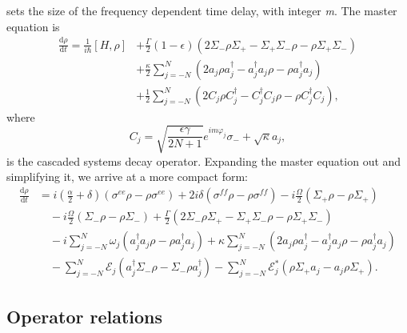 \documentclass{article}
\begin{document}
sets the size of the frequency dependent time delay, with integer \textit{m}. The master equation is
\begin{align}\label{master_equation_full}
	\frac{\mathrm{d} \rho}{\mathrm{d} t} = \frac{1}{i \hbar} [H, \rho] &+ \frac{\Gamma}{2}(1 - \epsilon) \left(2 \Sigma_{-} \rho \Sigma_{+} - \Sigma_{+} \Sigma_{-} \rho - \rho \Sigma_{+} \Sigma_{-}\right) \nonumber \\
	&+ \frac{\kappa}{2} \sum_{j=-N}^{N} \left( 2 a_{j} \rho a^{\dagger}_{j} - a^{\dagger}_{j} a_{j} \rho - \rho a^{\dagger}_{j} a_{j} \right) \\
	&+ \frac{1}{2} \sum_{j=-N}^{N} \left(2 C_{j} \rho C^{\dagger}_{j} - C^{\dagger}_{j} C_{j} \rho - \rho C^{\dagger}_{j} C_{j} \right), \nonumber
\end{align}
where
\begin{equation}
	C_{j} = \sqrt{\frac{\epsilon \gamma}{2N+1}} e^{i m \varphi_{j}} \sigma_{-} + \sqrt{\kappa} a_{j},
\end{equation}
is the cascaded systems decay operator. Expanding the master equation out and simplifying it, we arrive at a more compact form:
\begin{align}
	\frac{\mathrm{d} \rho}{\mathrm{d} t} &= i \left( \frac{\alpha}{2} + \delta \right) \left( \sigma^{ee} \rho - \rho \sigma^{ee} \right) + 2 i \delta \left( \sigma^{ff} \rho - \rho \sigma^{ff} \right) - i \frac{\Omega}{2} \left( \Sigma_{+} \rho - \rho \Sigma_{+} \right) \nonumber \\
	&\quad  - i \frac{\Omega}{2} \left(\Sigma_{-} \rho - \rho \Sigma_{-}\right) + \frac{\Gamma}{2} \left( 2\Sigma_{-} \rho \Sigma_{+} - \Sigma_{+} \Sigma_{-} \rho - \rho \Sigma_{+} \Sigma_{-} \right) \nonumber \\
	&\quad - i \sum_{j=-N}^{N} \omega_{j} \left( a^{\dagger}_{j} a_{j} \rho - \rho a^{\dagger}_{j} a_{j} \right) + \kappa \sum_{j=-N}^{N} \left( 2 a_{j} \rho a^{\dagger}_{j} - a^{\dagger}_{j} a_{j} \rho - \rho a^{\dagger}_{j} a_{j} \right) \nonumber \\
	&\quad - \sum_{j=-N}^{N} \mathcal{E}_{j} \left( a^{\dagger}_{j} \Sigma_{-} \rho - \Sigma_{-} \rho a^{\dagger}_{j} \right) - \sum_{j=-N}^{N} \mathcal{E}_{j}^{*} \left( \rho \Sigma_{+} a_{j} - a_{j} \rho \Sigma_{+} \right) .
\end{align}

\subsection{Operator relations}
\end{document}
